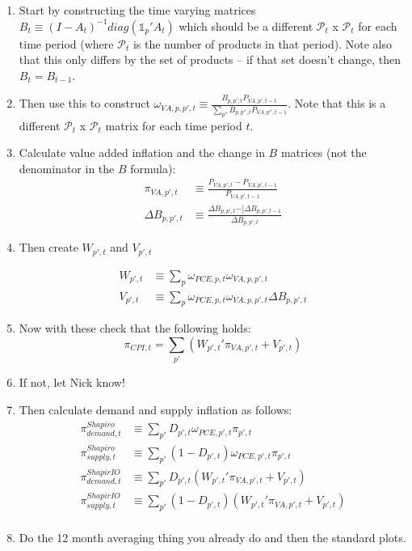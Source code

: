 \documentclass[12pt,english]{article}
\begin{document}
\begin{enumerate}
	\item Start by constructing the time varying matrices $B_t\equiv (I-A_t)^{-1}diag(\mathds{1}_p'A_t)$ which should be a different $\mathcal{P}_t$ x $\mathcal{P}_t$ for each time period (where $\mathcal{P}_t$ is the number of products in that period). Note also that this only differs by the set of products -- if that set doesn't change, then $B_t = B_{t-1}$.
	\item Then use this to construct $\omega_{VA,p,p',t} \equiv \frac{B_{p,p',t}P_{VA,p',t-1}}{\sum_{p''} B_{p,p'',t}P_{VA,p'',t-1}}$. Note that this is a different $\mathcal{P}_t$ x $\mathcal{P}_t$ matrix for each time period $t$. 
	\item Calculate value added inflation and the change in $B$ matrices (not the denominator in the $B$ formula):
	\begin{align*}
		\pi_{VA,p',t}&\equiv \frac{P_{VA,p',t}-P_{VA,p',t-1}}{P_{VA,p',t-1}}\\
		\Delta B_{p,p',t} &\equiv \frac{\Delta B_{p,p',t}-]\Delta B_{p,p',t-1}}{\Delta B_{p,p',t}}
	\end{align*}
	\item Then create $W_{p',t}$ and $V_{p',t}$
	
	\begin{align*}
		W_{p',t}&\equiv \sum_p \omega_{PCE,p,t}\omega_{VA,p,p',t}\\
		V_{p',t}&\equiv \sum_p \omega_{PCE,p,t}\omega_{VA,p,p',t}\Delta B_{p,p',t}
	\end{align*}
	\item Now with these check that the following holds:
	\[
	\pi_{CPI,t} = \sum_{p'} \left(W_{p',t}' \pi_{VA,p',t} + V_{p',t}\right)
	\]
	\item If not, let Nick know!
	\item Then calculate demand and supply inflation as follows:
	\begin{align*}
		\pi_{demand,t}^{Shapiro} &\equiv \sum_{p'} D_{p',t} \omega_{PCE,p',t} \pi_{p',t}\\
		\pi_{supply,t}^{Shapiro} &\equiv \sum_{p'} (1-D_{p',t}) \omega_{PCE,p',t} \pi_{p',t}\\		
		\pi_{demand,t}^{ShapirIO} &\equiv \sum_{p'} D_{p',t} \left(W_{p',t}' \pi_{VA,p',t} + V_{p',t}\right)\\
		\pi_{supply,t}^{ShapirIO} &\equiv \sum_{p'} (1-D_{p',t}) \left(W_{p',t}' \pi_{VA,p',t} + V_{p',t}\right)\\	
	\end{align*}
	\item Do the 12 month averaging thing you already do and then the standard plots.
\end{enumerate}
\end{document}
